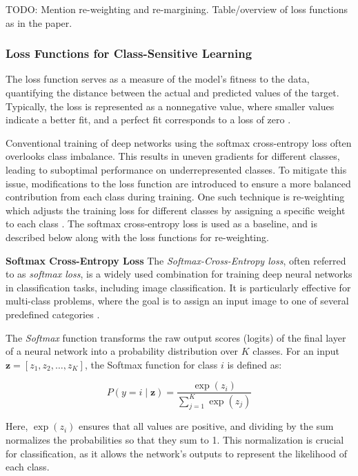 TODO: Mention re-weighting and re-margining.
Table/overview of loss functions as in the paper.


\subsubsection{Loss Functions for Class-Sensitive Learning}

The loss function serves as a measure of the model's fitness to the data, quantifying the distance between the actual and predicted values of the target. Typically, the loss is represented as a nonnegative value, where smaller values indicate a better fit, and a perfect fit corresponds to a loss of zero \cite{zhang2023dive}.

Conventional training of deep networks using the softmax cross-entropy loss often overlooks class imbalance. This results in uneven gradients for different classes, leading to suboptimal performance on underrepresented classes. To mitigate this issue, modifications to the loss function are introduced to ensure a more balanced contribution from each class during training. One such technique is re-weighting which adjusts the training loss for different classes by assigning a specific weight to each class \cite{zhang2023deep}. The softmax cross-entropy loss is used as a baseline, and is described below along with the loss functions for re-weighting.

\myindent \textbf{Softmax Cross-Entropy Loss}
The \textit{Softmax-Cross-Entropy loss}, often referred to as \textit{softmax loss}, is a widely used combination for training deep neural networks in classification tasks, including image classification. It is particularly effective for multi-class problems, where the goal is to assign an input image to one of several predefined categories \cite{cs231n} \cite{pytorch_crossentropy}.

The \textit{Softmax} function transforms the raw output scores (logits) of the final layer of a neural network into a probability distribution over \( K \) classes. For an input \( \mathbf{z} = [z_1, z_2, \dots, z_K] \), the Softmax function for class \( i \) is defined as:

\begin{equation}
    P(y = i \mid \mathbf{z}) = \frac{\exp(z_i)}{\sum_{j=1}^{K} \exp(z_j)}
\end{equation}

Here, \( \exp(z_i) \) ensures that all values are positive, and dividing by the sum normalizes the probabilities so that they sum to 1. This normalization is crucial for classification, as it allows the network's outputs to represent the likelihood of each class.

